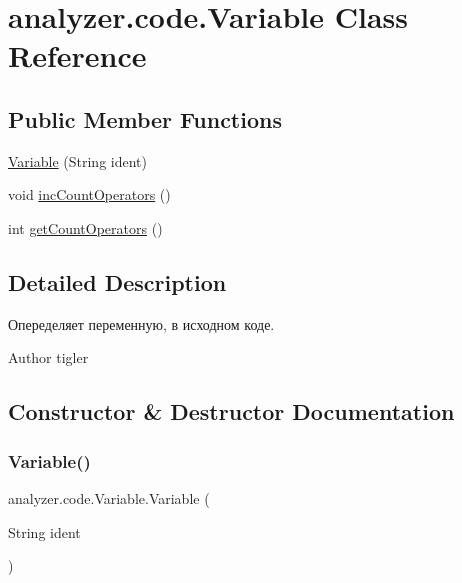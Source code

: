 \hypertarget{classanalyzer_1_1code_1_1Variable}{}\section{analyzer.\+code.\+Variable Class Reference}
\label{classanalyzer_1_1code_1_1Variable}
\subsection*{Public Member Functions}
\begin{DoxyCompactItemize}
\item 
\hyperlink{classanalyzer_1_1code_1_1Variable_a492abfcee26b2bf104175ff2772c3a76}{Variable} (String ident)
\item 
void \hyperlink{classanalyzer_1_1code_1_1Variable_a9ff60aa209b91fd406d2f529fd4d721d}{inc\+Count\+Operators} ()
\item 
int \hyperlink{classanalyzer_1_1code_1_1Variable_a03cf6dacfd545ab3ee82b5109ecd0e14}{get\+Count\+Operators} ()
\end{DoxyCompactItemize}


\subsection{Detailed Description}
Опеределяет переменную, в исходном коде. \begin{DoxyAuthor}{Author}
tigler 
\end{DoxyAuthor}


\subsection{Constructor \& Destructor Documentation}
\mbox{\label{classanalyzer_1_1code_1_1Variable_a492abfcee26b2bf104175ff2772c3a76}} 
\subsubsection{\texorpdfstring{Variable()}{Variable()}}
{\footnotesize\ttfamily analyzer.\+code.\+Variable.\+Variable (\begin{DoxyParamCaption}\item[{String}]{ident }\end{DoxyParamCaption})\hspace{0.3cm}{\ttfamily [inline]}}

